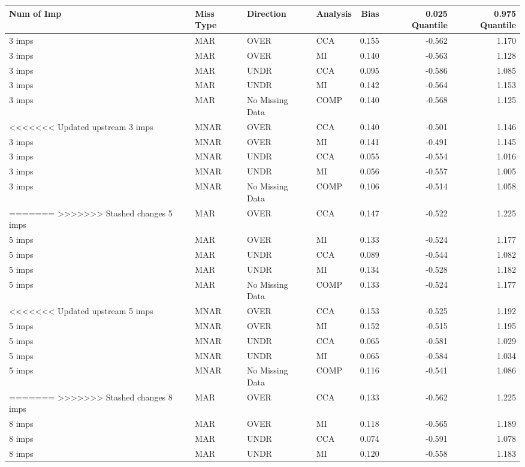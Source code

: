 \documentclass[
  letterpaper,
  DIV=11,
  numbers=noendperiod]{scrartcl}
\begin{document}
\begin{tabular}[t]{llllrrr}
\toprule
Num of Imp & Miss Type & Direction & Analysis & Bias & 0.025 Quantile & 0.975 Quantile\\
\midrule
3 imps & MAR & OVER & CCA & 0.155 & -0.562 & 1.170\\
3 imps & MAR & OVER & MI & 0.140 & -0.563 & 1.128\\
3 imps & MAR & UNDR & CCA & 0.095 & -0.586 & 1.085\\
3 imps & MAR & UNDR & MI & 0.142 & -0.564 & 1.153\\
3 imps & MAR & No Missing Data & COMP & 0.140 & -0.568 & 1.125\\
\addlinespace
<<<<<<< Updated upstream
3 imps & MNAR & OVER & CCA & 0.140 & -0.501 & 1.146\\
3 imps & MNAR & OVER & MI & 0.141 & -0.491 & 1.145\\
3 imps & MNAR & UNDR & CCA & 0.055 & -0.554 & 1.016\\
3 imps & MNAR & UNDR & MI & 0.056 & -0.557 & 1.005\\
3 imps & MNAR & No Missing Data & COMP & 0.106 & -0.514 & 1.058\\
\addlinespace
=======
>>>>>>> Stashed changes
5 imps & MAR & OVER & CCA & 0.147 & -0.522 & 1.225\\
5 imps & MAR & OVER & MI & 0.133 & -0.524 & 1.177\\
5 imps & MAR & UNDR & CCA & 0.089 & -0.544 & 1.082\\
5 imps & MAR & UNDR & MI & 0.134 & -0.528 & 1.182\\
5 imps & MAR & No Missing Data & COMP & 0.133 & -0.524 & 1.177\\
\addlinespace
<<<<<<< Updated upstream
5 imps & MNAR & OVER & CCA & 0.153 & -0.525 & 1.192\\
5 imps & MNAR & OVER & MI & 0.152 & -0.515 & 1.195\\
5 imps & MNAR & UNDR & CCA & 0.065 & -0.581 & 1.029\\
5 imps & MNAR & UNDR & MI & 0.065 & -0.584 & 1.034\\
5 imps & MNAR & No Missing Data & COMP & 0.116 & -0.541 & 1.086\\
\addlinespace
=======
>>>>>>> Stashed changes
8 imps & MAR & OVER & CCA & 0.133 & -0.562 & 1.225\\
8 imps & MAR & OVER & MI & 0.118 & -0.565 & 1.189\\
8 imps & MAR & UNDR & CCA & 0.074 & -0.591 & 1.078\\
8 imps & MAR & UNDR & MI & 0.120 & -0.558 & 1.183\\

\end{tabular}
\end{document}
